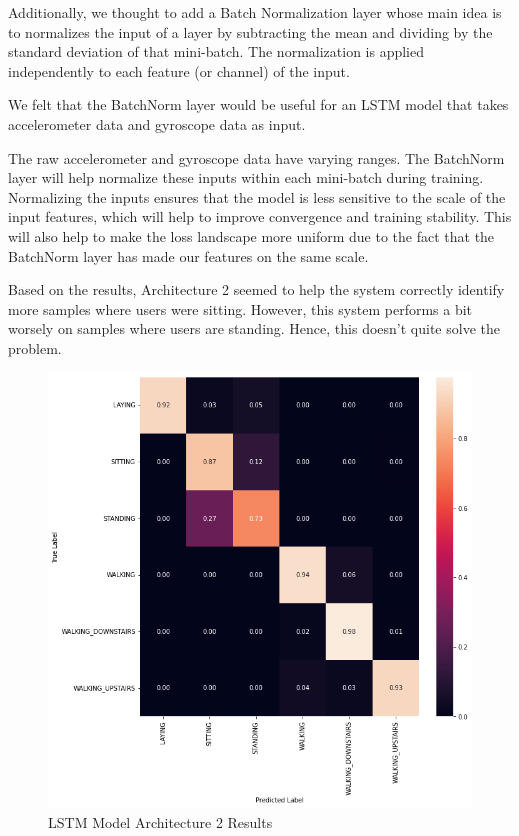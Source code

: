 \documentclass[11pt]{article}
\begin{document}
Additionally, we thought to add a Batch Normalization layer whose main idea is to normalizes the input of a layer by subtracting the mean and dividing by the standard deviation of that mini-batch. The normalization is applied independently to each feature (or channel) of the input. \newline 

We felt that the BatchNorm layer would be useful for an LSTM model that takes accelerometer data and gyroscope data as input.

The raw accelerometer and gyroscope data have varying ranges. The BatchNorm layer will help normalize these inputs within each mini-batch during training. Normalizing the inputs ensures that the model is less sensitive to the scale of the input features, which will help to improve convergence and training stability. This will also help to make the loss landscape more uniform due to the fact that the BatchNorm layer has made our features on the same scale. \newline 

Based on the results, Architecture 2 seemed to help the system correctly identify more samples where users were sitting. However, this system performs a bit worsely on samples where users are standing. Hence, this doesn't quite solve the problem. 

\begin{figure}[h!]
	\includegraphics[width= 0.9 \linewidth]{LSTM(2)_Results.png}
	\centering
	\caption{LSTM Model Architecture 2 Results}
	\label{LSTM(2)_Results.png}
\end{figure}
\end{document}
